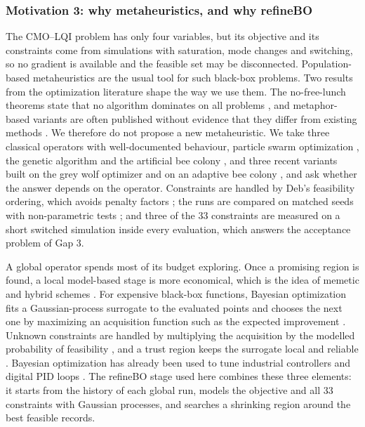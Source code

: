 \subsubsection{Motivation 3: why metaheuristics, and why refineBO}
The CMO--LQI problem has only four variables, but its objective and its
constraints come from simulations with saturation, mode changes and switching,
so no gradient is available and the feasible set may be disconnected.
Population-based metaheuristics are the usual tool for such black-box problems.
Two results from the optimization literature shape the way we use them. The
no-free-lunch theorems state that no algorithm dominates on all problems
\citep{Wolpert1997}, and metaphor-based variants are often published without
evidence that they differ from existing methods \citep{Sorensen2015}. We
therefore do not propose a new metaheuristic. We take three classical operators
with well-documented behaviour, particle swarm optimization
\citep{Kennedy1995,Poli2007}, the genetic algorithm \citep{Holland1975} and the
artificial bee colony \citep{Karaboga2007,Karaboga2008}, and three recent
variants built on the grey wolf optimizer and on an adaptive bee colony
\citep{Mirjalili2014,NadimiShahraki2021,Hou2022,Alsamia2024}, and ask whether the
answer depends on the operator. Constraints are handled by Deb's feasibility
ordering, which avoids penalty factors \citep{Deb2000,MezuraMontes2011}; the
runs are compared on matched seeds with non-parametric tests
\citep{Derrac2011,Demsar2006}; and three of the 33 constraints are measured on
a short switched simulation inside every evaluation, which answers the
acceptance problem of Gap 3.

A global operator spends most of its budget exploring. Once a promising region
is found, a local model-based stage is more economical, which is the idea of
memetic and hybrid schemes \citep{Neri2012}. For expensive black-box functions,
Bayesian optimization fits a Gaussian-process surrogate to the evaluated points
and chooses the next one by maximizing an acquisition function such as the
expected improvement \citep{Jones1998,Rasmussen2006,Snoek2012,Shahriari2016}. Unknown
constraints are handled by multiplying the acquisition by the modelled
probability of feasibility \citep{Gardner2014}, and a trust region keeps the
surrogate local and reliable \citep{Eriksson2019}. Bayesian optimization has
already been used to tune industrial controllers \citep{NeumannBrosig2020} and
digital PID loops \citep{Coutinho2023}. The refineBO stage used here combines
these three elements: it starts from the history of each global run, models the
objective and all 33 constraints with Gaussian processes, and searches a
shrinking region around the best feasible records.


